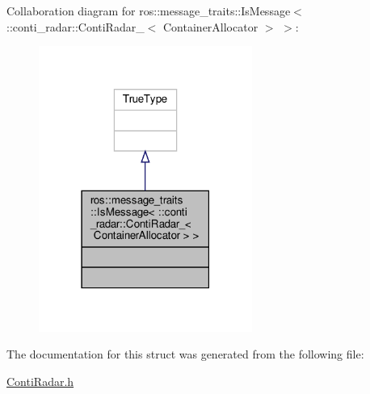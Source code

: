 Collaboration diagram for ros\+:\+:message\+\_\+traits\+:\+:Is\+Message$<$ \+:\+:conti\+\_\+radar\+:\+:Conti\+Radar\+\_\+$<$ Container\+Allocator $>$ $>$\+:\nopagebreak
\begin{figure}[H]
\begin{center}
\leavevmode
\includegraphics[width=198pt]{d3/d67/structros_1_1message__traits_1_1IsMessage_3_01_1_1conti__radar_1_1ContiRadar___3_01ContainerAllocator_01_4_01_4__coll__graph}
\end{center}
\end{figure}


The documentation for this struct was generated from the following file\+:\begin{DoxyCompactItemize}
\item 
\hyperlink{ContiRadar_8h}{Conti\+Radar.\+h}\end{DoxyCompactItemize}
